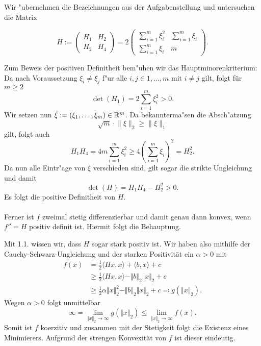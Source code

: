 Wir "ubernehmen die Bezeichnungen aus der Aufgabenstellung und untersuchen die Matrix

\[
H:=
\begin{pmatrix}
H_1 & H_2 \\ H_2 & H_4 \end{pmatrix}
= 2 \begin{pmatrix}
\sum_{i=1}^m \xi_i^2 & \sum_{i=1}^m \xi_i \\
\sum_{i=1}^m \xi_i & m
\end{pmatrix}.
\]
\begin{compactenum}[(i)]
\item Zum Beweis der positiven Definitheit
bem"uhen wir das Hauptminorenkriterium: Da
nach Voraussetzung $\xi_i \neq \xi_j$ f"ur alle $i,j \in {1,\ldots,m}$ mit $i\neq j$ gilt, folgt für $m\geq 2$
\[
\det(H_1) = 2\sum_{i=1}^m \xi_i^2 > 0.
\]
Wir setzen nun $\xi := (\xi_1,\ldots,\xi_m)\in\mathbb{R}^m$. Da bekannterma"sen die Absch"atzung
\[
\sqrt m\cdot \lVert \xi \rVert_2 \ge \lVert \xi \rVert_1
\]
gilt, folgt auch
\[
H_1 H_4 = 4 m \sum_{i=1}^m \xi_i^2
\ge 4\left(\sum_{i=1}^m \xi_i\right)^2
= H_2^2.
\]
Da nun alle Eintr"age von $\xi$ verschieden
sind, gilt sogar die strikte Ungleichung und
damit
\[
\det(H) = H_1 H_4 - H_2^2 > 0.
\]
Es folgt die positive Definitheit von $H$. \\ \\
Ferner ist $f$ zweimal stetig differenzierbar und damit genau dann konvex, wenn $f''=H$ positiv definit ist. 
Hiermit folgt die Behauptung.

 \item Mit 1.1. wissen wir, dass $H$ sogar stark positiv ist. Wir haben also mithilfe der Cauchy-Schwarz-Ungleichung und der starken Positivität
 ein $\alpha > 0$ mit
 \begin{align*}
  f(x)&=\frac{1}{2}\langle Hx,x\rangle+\langle b, x\rangle+c\\
  &\geq\frac{1}{2}\langle Hx,x\rangle-\Vert b\Vert_2\Vert x\Vert_2+c\\
  &\geq\frac{1}{2}\alpha\Vert x\Vert_2^2-\Vert b\Vert_2\Vert x\Vert_2+c \eqqcolon g(\Vert x\Vert_2).
 \end{align*}
 Wegen $\alpha >0$ folgt unmittelbar
 \begin{displaymath}
  \infty=\lim_{\Vert x\Vert_2\to\infty}g(\Vert x\Vert_2)\leq \lim_{\Vert x\Vert_2\to\infty} f(x).
 \end{displaymath}
 Somit ist $f$ koerzitiv und zusammen mit der Stetigkeit folgt die Existenz eines Minimierers. Aufgrund der strengen Konvexität von $f$ ist dieser eindeutig.

\end{compactenum}
